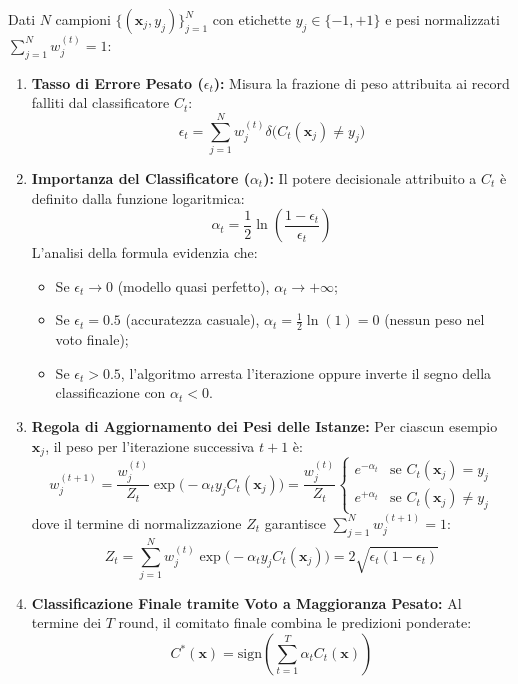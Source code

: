 Dati $N$ campioni $\{(\mathbf{x}_j, y_j)\}_{j=1}^N$ con etichette $y_j \in \{-1, +1\}$ e pesi normalizzati $\sum_{j=1}^N w_j^{(t)} = 1$:
\begin{enumerate}
    \item \textbf{Tasso di Errore Pesato ($\epsilon_t$):} Misura la frazione di peso attribuita ai record falliti dal classificatore $C_t$:
    \begin{equation}
        \epsilon_t = \sum_{j=1}^N w_j^{(t)} \delta\big(C_t(\mathbf{x}_j) \neq y_j\big)
    \end{equation}
    \item \textbf{Importanza del Classificatore ($\alpha_t$):} Il potere decisionale attribuito a $C_t$ è definito dalla funzione logaritmica:
    \begin{equation}
        \alpha_t = \frac{1}{2} \ln\left( \frac{1 - \epsilon_t}{\epsilon_t} \right)
        \label{eq:dm-adaboost-alpha}
    \end{equation}
    L'analisi della formula evidenzia che:
    \begin{itemize}
        \item Se $\epsilon_t \to 0$ (modello quasi perfetto), $\alpha_t \to +\infty$;
        \item Se $\epsilon_t = 0.5$ (accuratezza casuale), $\alpha_t = \frac{1}{2}\ln(1) = 0$ (nessun peso nel voto finale);
        \item Se $\epsilon_t > 0.5$, l'algoritmo arresta l'iterazione oppure inverte il segno della classificazione con $\alpha_t < 0$.
    \end{itemize}

    \item \textbf{Regola di Aggiornamento dei Pesi delle Istanze:} Per ciascun esempio $\mathbf{x}_j$, il peso per l'iterazione successiva $t+1$ è:
    \begin{equation}
        w_j^{(t+1)} = \frac{w_j^{(t)}}{Z_t} \exp\big( -\alpha_t y_j C_t(\mathbf{x}_j) \big) = \frac{w_j^{(t)}}{Z_t} \begin{cases} e^{-\alpha_t} & \text{se } C_t(\mathbf{x}_j) = y_j \\ e^{+\alpha_t} & \text{se } C_t(\mathbf{x}_j) \neq y_j \end{cases}
    \end{equation}
    dove il termine di normalizzazione $Z_t$ garantisce $\sum_{j=1}^N w_j^{(t+1)} = 1$:
    \begin{equation}
        Z_t = \sum_{j=1}^N w_j^{(t)} \exp\big( -\alpha_t y_j C_t(\mathbf{x}_j) \big) = 2 \sqrt{\epsilon_t (1 - \epsilon_t)}
    \end{equation}

    \item \textbf{Classificazione Finale tramite Voto a Maggioranza Pesato:} Al termine dei $T$ round, il comitato finale combina le predizioni ponderate:
    \begin{equation}
        C^*(\mathbf{x}) = \text{sign}\left( \sum_{t=1}^T \alpha_t C_t(\mathbf{x}) \right)
    \end{equation}
\end{enumerate}

